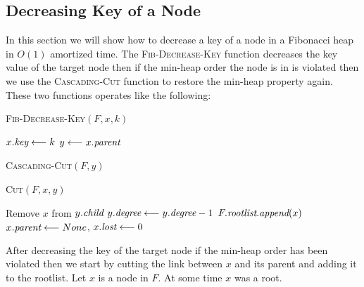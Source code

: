 \subsection{Decreasing Key of a Node}
In this section we will show how to decrease a key of a node in a Fibonacci heap in $O(1)$ amortized time. The \textsc{Fib-Decrease-Key} function decreases the key value of the target node then if the min-heap order the node is in is violated then we use the \textsc{Cascading-Cut} function to restore the min-heap property again. These two functions operates like the following:
\begin{center}
	\begin{minipage}{0.45\textwidth}
		\begin{algorithm}[H]
			\caption{\textsc{Fib-Decrease-Key}$(F,x,k)$}
			\DontPrintSemicolon
			$x.\emph{key}\longleftarrow k$\;
			$y\longleftarrow x.\emph{parent}$\;
		\end{algorithm}
	\end{minipage}\hfill
	\begin{minipage}{0.45\textwidth}
		\begin{algorithm}[H]
			\caption{\textsc{Cascading-Cut}$(F,y)$}
			\DontPrintSemicolon
		\end{algorithm}
		\begin{algorithm}[H]
			\caption{\textsc{Cut}$(F,x,y)$}
			\DontPrintSemicolon
			Remove $x$ from $y.\emph{child}$\;
			$y.\emph{degree}\longleftarrow y.\emph{degree}-1$\;
			$F.\emph{rootlist}.\emph{append}(x)$\;
			$x.\emph{parent}\longleftarrow None$, $x.\emph{lost}\longleftarrow 0$\;
		\end{algorithm}
	\end{minipage}
\end{center}
After decreasing the key of the target node if the min-heap order has been violated then we start by cutting the link between $x$ and its parent and adding it to the rootlist. Let $x$ is a node in $F$. At some time $x$ was a root. 
